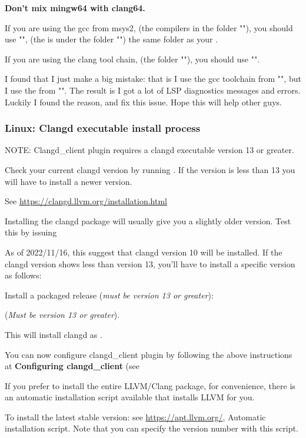     \textbf{Don't mix mingw64 with clang64.}
    
    If you are using the gcc from msys2, (the compilers in the folder ""), you should use "", (the  is under the folder "") the same folder as your .
 
	If you are using the clang tool chain, (the folder ""), you should use "".

	I found that I just make a big mistake: that is I use the gcc toolchain from "", but I use the  from "".
    The result is I got a lot of LSP diagnostics messages and errors.\\
    Luckily I found the reason, and fix this issue. Hope this will help other guys.

\subsubsection{Linux: Clangd executable install process}\label{sec:linux_install}

NOTE: Clangd\_client plugin requires a clangd executable version 13 or greater.

Check your current clangd version by running .\newline
If the version is less than 13 you will have to install a newer version.

See \url{https://clangd.llvm.org/installation.html}

Installing the clangd package will usually give you a slightly older version.\newline
Test this by issuing 

As of 2022/11/16, this suggest that clangd version 10 will be installed.\newline
If the clangd version shows less than version 13, you'll have to install a specific version as follows:

Install a packaged release (\textit{must be version 13 or greater}):

 (\textit{Must be version 13 or greater}).

This will install clangd as .

You can now configure clangd\_client plugin by following the above instructions at
\textbf{Configuring clangd\_client} (see 

If you prefer to install the entire LLVM/Clang package, for convenience, there is
an automatic installation script available that installs LLVM for you.

To install the latest stable version: see \url{https://apt.llvm.org/}, Automatic installation script.
Note that you can specify the version number with this script.